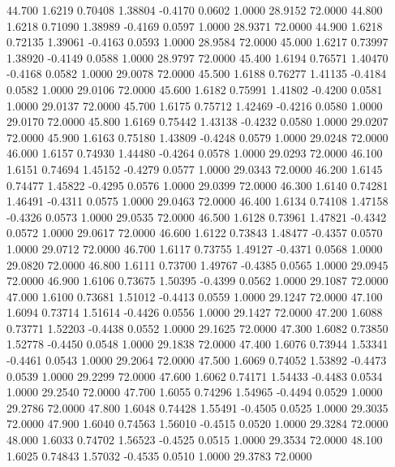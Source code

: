   44.700   1.6219   0.70408   1.38804  -0.4170   0.0602   1.0000  28.9152  72.0000
  44.800   1.6218   0.71090   1.38989  -0.4169   0.0597   1.0000  28.9371  72.0000
  44.900   1.6218   0.72135   1.39061  -0.4163   0.0593   1.0000  28.9584  72.0000
  45.000   1.6217   0.73997   1.38920  -0.4149   0.0588   1.0000  28.9797  72.0000
  45.400   1.6194   0.76571   1.40470  -0.4168   0.0582   1.0000  29.0078  72.0000
  45.500   1.6188   0.76277   1.41135  -0.4184   0.0582   1.0000  29.0106  72.0000
  45.600   1.6182   0.75991   1.41802  -0.4200   0.0581   1.0000  29.0137  72.0000
  45.700   1.6175   0.75712   1.42469  -0.4216   0.0580   1.0000  29.0170  72.0000
  45.800   1.6169   0.75442   1.43138  -0.4232   0.0580   1.0000  29.0207  72.0000
  45.900   1.6163   0.75180   1.43809  -0.4248   0.0579   1.0000  29.0248  72.0000
  46.000   1.6157   0.74930   1.44480  -0.4264   0.0578   1.0000  29.0293  72.0000
  46.100   1.6151   0.74694   1.45152  -0.4279   0.0577   1.0000  29.0343  72.0000
  46.200   1.6145   0.74477   1.45822  -0.4295   0.0576   1.0000  29.0399  72.0000
  46.300   1.6140   0.74281   1.46491  -0.4311   0.0575   1.0000  29.0463  72.0000
  46.400   1.6134   0.74108   1.47158  -0.4326   0.0573   1.0000  29.0535  72.0000
  46.500   1.6128   0.73961   1.47821  -0.4342   0.0572   1.0000  29.0617  72.0000
  46.600   1.6122   0.73843   1.48477  -0.4357   0.0570   1.0000  29.0712  72.0000
  46.700   1.6117   0.73755   1.49127  -0.4371   0.0568   1.0000  29.0820  72.0000
  46.800   1.6111   0.73700   1.49767  -0.4385   0.0565   1.0000  29.0945  72.0000
  46.900   1.6106   0.73675   1.50395  -0.4399   0.0562   1.0000  29.1087  72.0000
  47.000   1.6100   0.73681   1.51012  -0.4413   0.0559   1.0000  29.1247  72.0000
  47.100   1.6094   0.73714   1.51614  -0.4426   0.0556   1.0000  29.1427  72.0000
  47.200   1.6088   0.73771   1.52203  -0.4438   0.0552   1.0000  29.1625  72.0000
  47.300   1.6082   0.73850   1.52778  -0.4450   0.0548   1.0000  29.1838  72.0000
  47.400   1.6076   0.73944   1.53341  -0.4461   0.0543   1.0000  29.2064  72.0000
  47.500   1.6069   0.74052   1.53892  -0.4473   0.0539   1.0000  29.2299  72.0000
  47.600   1.6062   0.74171   1.54433  -0.4483   0.0534   1.0000  29.2540  72.0000
  47.700   1.6055   0.74296   1.54965  -0.4494   0.0529   1.0000  29.2786  72.0000
  47.800   1.6048   0.74428   1.55491  -0.4505   0.0525   1.0000  29.3035  72.0000
  47.900   1.6040   0.74563   1.56010  -0.4515   0.0520   1.0000  29.3284  72.0000
  48.000   1.6033   0.74702   1.56523  -0.4525   0.0515   1.0000  29.3534  72.0000
  48.100   1.6025   0.74843   1.57032  -0.4535   0.0510   1.0000  29.3783  72.0000
